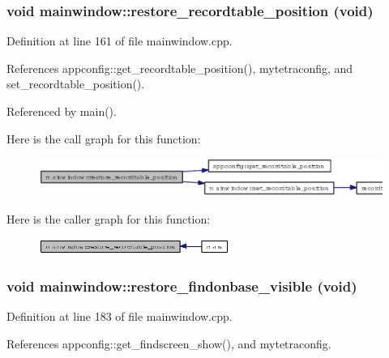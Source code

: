 \subsubsection{\setlength{\rightskip}{0pt plus 5cm}void mainwindow::restore\_\-recordtable\_\-position (void)}\label{classmainwindow_555e2cff5de029fedcf796372d57386a}




Definition at line 161 of file mainwindow.cpp.

References appconfig::get\_\-recordtable\_\-position(), mytetraconfig, and set\_\-recordtable\_\-position().

Referenced by main().

Here is the call graph for this function:\begin{figure}[H]
\begin{center}
\leavevmode
\includegraphics[width=388pt]{classmainwindow_555e2cff5de029fedcf796372d57386a_cgraph}
\end{center}
\end{figure}


Here is the caller graph for this function:\begin{figure}[H]
\begin{center}
\leavevmode
\includegraphics[width=176pt]{classmainwindow_555e2cff5de029fedcf796372d57386a_icgraph}
\end{center}
\end{figure}
\subsubsection{\setlength{\rightskip}{0pt plus 5cm}void mainwindow::restore\_\-findonbase\_\-visible (void)}\label{classmainwindow_676fda5aa4ca3b8d2d57c4521d69f00b}




Definition at line 183 of file mainwindow.cpp.

References appconfig::get\_\-findscreen\_\-show(), and mytetraconfig.

